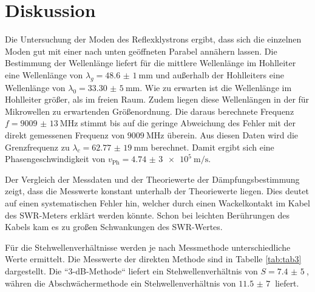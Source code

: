 \section{Diskussion}
\label{sec:Diskussion}
Die Untersuchung der Moden des Reflexklystrons ergibt, dass sich die einzelnen Moden gut mit einer
nach unten geöffneten Parabel annähern lassen. Die Bestimmung der Wellenlänge liefert für
die mittlere Wellenlänge im Hohlleiter eine Wellenlänge von $\lambda_g=\SI{48,6(1)}{\mm}$ und
außerhalb der Hohlleiters eine Wellenlänge von $\lambda_0=\SI{33,30(5)}{\mm}$. Wie zu erwarten ist die
Wellenlänge im Hohlleiter größer, als im freien Raum. Zudem liegen diese Wellenlängen in der für
Mikrowellen zu erwartenden Größenordnung. Die daraus berechnete Frequenz $f=\SI{9009(13)}{\MHz}$
stimmt bis auf die geringe Abweichung des Fehler mit der direkt gemessenen Frequenz von $\SI{9009}{\MHz}$
überein. Aus diesen Daten wird die Grenzfrequenz zu $\lambda_c=\SI{62,77(19)}{\mm}$ berechnet.
Damit ergibt sich eine Phasengeschwindigkeit von $v_\text{Ph}=\SI{4,74(3)e5}{\m\per\s}$.

Der Vergleich der Messdaten und der Theoriewerte der Dämpfungsbestimmung zeigt, dass die Messwerte
konstant unterhalb der Theoriewerte liegen. Dies deutet auf einen systematischen Fehler hin, welcher durch einen
Wackelkontakt im Kabel des SWR-Meters erklärt werden könnte. Schon bei leichten Berührungen des Kabels
kam es zu großen Schwankungen des SWR-Wertes.

Für die Stehwellenverhältnisse werden je nach Messmethode unterschiedliche Werte ermittelt. Die Messwerte der
direkten Methode sind in Tabelle \ref{tab:tab3} dargestellt. Die “3-dB-Methode“ liefert ein Stehwellenverhältnis
von $S=\SI{7,4(5)}{}$, währen die Abschwächermethode ein Stehwellenverhältnis von $\SI{11,5(7)}{}$ liefert.

